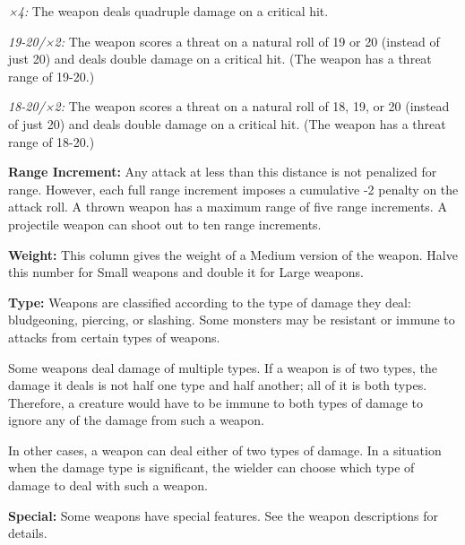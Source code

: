 \textit{×4:} The weapon deals quadruple damage on a critical hit.

\textit{19-20/×2:} The weapon scores a threat on a natural roll of 19 or 20 (instead of just 20) and deals double damage on a critical hit. (The weapon has a threat range of 19-20.)

\textit{18-20/×2:} The weapon scores a threat on a natural roll of 18, 19, or 20 (instead of just 20) and deals double damage on a critical hit. (The weapon has a threat range of 18-20.)

\textbf{Range Increment:} Any attack at less than this distance is not penalized for range. However, each full range increment imposes a cumulative -2 penalty on the attack roll. A thrown weapon has a maximum range of five range increments. A projectile weapon can shoot out to ten range increments.

\textbf{Weight:} This column gives the weight of a Medium version of the weapon. Halve this number for Small weapons and double it for Large weapons.

\textbf{Type:} Weapons are classified according to the type of damage they deal: bludgeoning, piercing, or slashing. Some monsters may be resistant or immune to attacks from certain types of weapons.

Some weapons deal damage of multiple types. If a weapon is of two types, the damage it deals is not half one type and half another; all of it is both types. Therefore, a creature would have to be immune to both types of damage to ignore any of the damage from such a weapon.

In other cases, a weapon can deal either of two types of damage. In a situation when the damage type is significant, the wielder can choose which type of damage to deal with such a weapon.

\textbf{Special:} Some weapons have special features. See the weapon descriptions for details.

